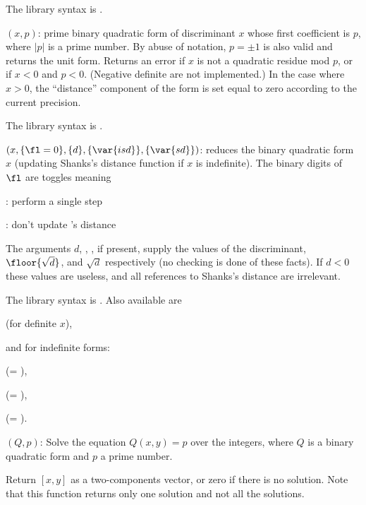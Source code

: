 The library syntax is .

$(x,p)$: \label{se:qfbprimeform}prime binary quadratic form of discriminant
$x$ whose first coefficient is $p$, where $|p|$ is a prime number.
By abuse of notation,
$p = \pm 1$ is also valid and returns the unit form. Returns an
error if $x$ is not a quadratic residue mod $p$, or if $x < 0$ and $p < 0$.
(Negative definite  are not implemented.) In the case where $x>0$,
the ``distance'' component of the form is set equal to zero according to the
current precision.

The library syntax is .

$(x,\{\fl=0\},\{d\},\{\var{isd}\},\{\var{sd}\})$: \label{se:qfbred}reduces the binary quadratic form $x$ (updating Shanks's distance function
if $x$ is indefinite). The binary digits of $\fl$ are toggles meaning

: perform a single  step

: don't update 's distance

The arguments $d$, , , if present, supply the values of the
discriminant, $\floor{\sqrt{d}}$, and $\sqrt{d}$ respectively
(no checking is done of these facts). If $d<0$ these values are useless,
and all references to Shanks's distance are irrelevant.

The library syntax is .
Also available are

 (for definite $x$),

\noindent and for indefinite forms:


 (= ),

 (= ),

 (= ).

$(Q,p)$: \label{se:qfbsolve}Solve the equation $Q(x,y)=p$ over the integers,
where $Q$ is a binary quadratic form and $p$ a prime number.

Return $[x,y]$ as a two-components vector, or zero if there is no solution.
Note that this function returns only one solution and not all the solutions.

